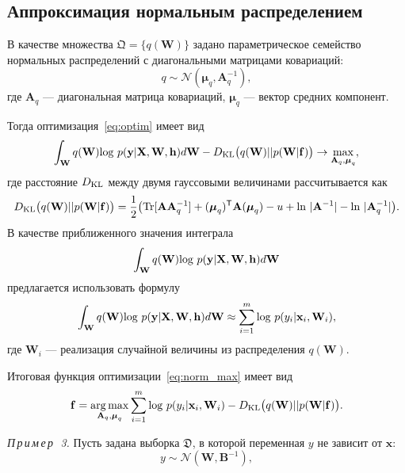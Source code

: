 \subsection{Аппроксимация нормальным распределением}
В качестве множества $\mathfrak{Q} = \{q(\mathbf{W})\}$ задано параметрическое семейство нормальных распределений с диагональными матрицами ковариаций:
\begin{equation}
\label{eq:diag}
	q \sim \mathcal{N}(\boldsymbol{\mu}_q, \mathbf{A}^{-1}_q),
\end{equation}
где $\mathbf{A}_q$ --- диагональная матрица ковариаций, $\boldsymbol{\mu}_q$ --- вектор средних компонент.

Тогда оптимизация~\eqref{eq:optim} имеет вид
\begin{equation}
\label{eq:norm_max}
 \int_{\mathbf{W}} q(\mathbf{W})\textnormal{log}~{p(\mathbf{y}|\mathbf{X},\mathbf{W},\mathbf{h})} d \mathbf{W} - D_\textnormal{KL}\bigl(q (\mathbf{W} )|| p (\mathbf{W}|\mathbf{f})\bigr) \to \max_{\mathbf{A}_q, \boldsymbol{\mu}_q},
\end{equation}
где расстояние $D_\textnormal{KL}$ между двумя гауссовыми величинами рассчитывается как 
\[
	D_\textnormal{KL}\bigl(q (\mathbf{W}) || p (\mathbf{W}|\mathbf{f})\bigr) = \frac{1}{2} \bigl( \textnormal{Tr} [\mathbf{A}\mathbf{A}^{-1}_q] + (\boldsymbol{\mu}_q)^\mathsf{T}\mathbf{A}(\boldsymbol{\mu}_q) - u +\textnormal{ln}~|\mathbf{A}^{-1}| - \textnormal{ln}~|\mathbf{A}_q^{-1}| \bigr).
\]
В качестве приближенного значения интеграла $$\int_{\mathbf{W}} q(\mathbf{W})\textnormal{log}~{p(\mathbf{y}|\mathbf{X},\mathbf{W},\mathbf{h})} d \mathbf{W}$$ предлагается использовать формулу
\[
\int_{\mathbf{W}} q(\mathbf{W})\textnormal{log}~{p(\mathbf{y}|\mathbf{X},\mathbf{W},\mathbf{h})} d \mathbf{W} \approx \sum_{i=1}^m \textnormal{log}~p({y}_i|\mathbf{x}_i, \mathbf{W}_i),
\]
где $\mathbf{W}_i$  --- реализация случайной величины из распределения $q(\mathbf{W})$.

Итоговая функция оптимизации~\eqref{eq:norm_max} имеет вид
\begin{equation}
\label{eq:gaus}
	\mathbf{f} = \operatorname*{arg\,max}_{\mathbf{A}_q, \boldsymbol{\mu}_q} \sum_{i=1}^m \textnormal{log}~p({y}_i|\mathbf{x}_i, \mathbf{W}_i) - D_\textnormal{KL}\bigl(q (\mathbf{W} )|| p (\mathbf{W}|\mathbf{f})\bigr).
\end{equation}

\textsl{П\,р\,и\,м\,е\,р~\,3.}
Пусть  задана выборка $\mathfrak{D}$, в которой переменная ${y}$ не зависит от $\mathbf{x}$:
\begin{equation}
\label{eq:example_post}
	{y} \sim \mathcal{N}(\mathbf{W}, \mathbf{B}^{-1}),
\end{equation}

